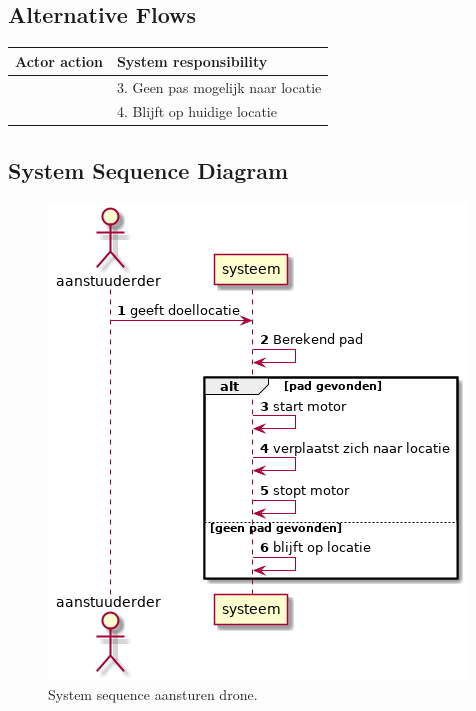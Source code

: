 \documentclass[a4paper, 11pt, oneside]{report}
\begin{document}
\subsection{Alternative Flows}


\begin{table}[H]
	\centering
	\begin{tabular}{|l|l|}
		\hline
		\rowcolor[HTML]{C0C0C0} 
		Actor action  & System responsibility   \\ \hline
				      & 3. Geen pas mogelijk naar locatie \\ \hline
					  & 4. Blijft op huidige locatie                        \\ \hline
	\end{tabular}
\end{table}


\subsection{System Sequence Diagram }
\label{Usecase:aansturendrone:systemsequence}


\begin{figure}[H]
	\begin{center}\includegraphics[height=.3\textheight]{UML/out/usecase/sequence/aansturendrone/aansturendrone.png}\end{center}
	\caption{System sequence aansturen drone.}
	\label{fig:aansturendrone:systemsequence}
\end{figure}
\end{document}

